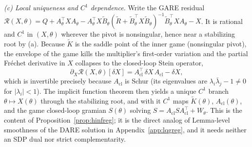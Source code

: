 \documentclass[twocolumn,amsthm]{autart}
\begin{document}
\emph{(c) Local uniqueness and $C^1$ dependence.} Write the GARE residual
$\mathcal R(X,\theta)=Q+A_\theta^\top XA_\theta-A_\theta^\top X\tilde B_\theta
(\tilde R+\tilde B_\theta^\top X\tilde B_\theta)^{-1}\tilde B_\theta^\top
XA_\theta-X$. It is rational and $C^1$ in $(X,\theta)$ wherever the pivot is
nonsingular, hence near a stabilizing root by (a). Because $\tilde K$ is the
saddle point of the inner game (nonsingular pivot), the envelope of the game
kills the multiplier's first-order variation and the partial Fr\'echet derivative
in $X$ collapses to the closed-loop Stein operator,
\begin{equation}\label{eq:gare-ift}
\partial_X\mathcal R(X,\theta)[\delta X]
=A_{\mathrm{cl}}^\top\,\delta X\,A_{\mathrm{cl}}-\delta X,
\end{equation}
which is invertible precisely because $A_{\mathrm{cl}}$ is Schur (its eigenvalues
are $\lambda_i\bar\lambda_j-1\neq0$ for $|\lambda_i|<1$). The implicit function
theorem then yields a unique $C^1$ branch $\theta\mapsto X(\theta)$ through the
stabilizing root, and with it $C^1$ maps $\tilde K(\theta)$, $A_{\mathrm{cl}}(\theta)$,
and the game closed-loop gramian $S(\theta)$ solving
$S=A_{\mathrm{cl}}SA_{\mathrm{cl}}^\top+W_\theta$. This is the content of
Proposition~\ref{prop:hinfreg}; it is the direct analog of
Lemma-level smoothness of the DARE solution in Appendix~\ref{app:lqgreg}, and it
needs neither an SDP dual nor strict complementarity.
\end{document}
